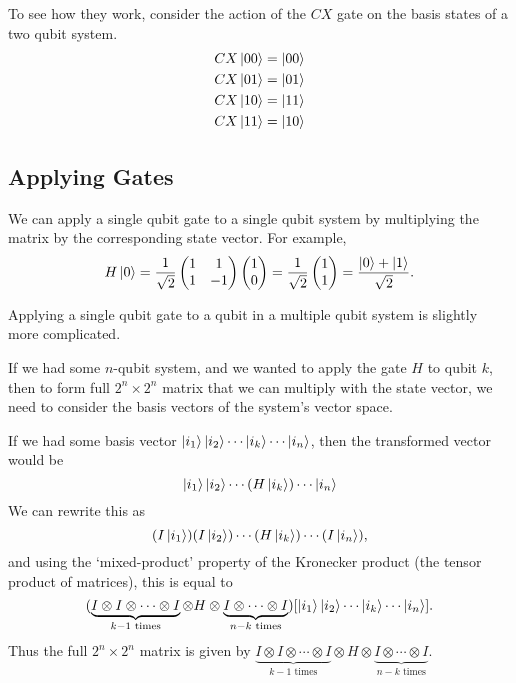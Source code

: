 \documentclass[11pt]{article}
\begin{document}
To see how they work, consider the action of the $CX$ gate on the basis states of a two qubit system.
\begin{align*}
	CX \ket{00} &= \ket{00} \\
	CX \ket{01} &= \ket{01} \\
	CX \ket{10} &= \ket{11} \\
	CX \ket{11} &= \ket{10} 
\end{align*}

\subsection{Applying Gates}

We can apply a single qubit gate to a single qubit system by multiplying the matrix by the corresponding state vector. For example,
$$
H \ket{0} = \frac{1}{\sqrt{2}}\begin{pmatrix}
	1 & 1 \\ 1 & -1
\end{pmatrix} \begin{pmatrix}
	1 \\ 0 
\end{pmatrix} = \frac{1}{\sqrt{2}}\begin{pmatrix}
	1 \\
	1
\end{pmatrix} = \frac{\ket{0} + \ket{1}}{\sqrt{2}}.
$$

Applying a single qubit gate to a qubit in a multiple qubit system is slightly more complicated. 

If we had some $n$-qubit system, and we wanted to apply the gate $H$ to qubit $k$, then to form full $2^n \times 2^n$ matrix that we can multiply with the state vector, we need to consider the basis vectors of the system's vector space.

If we had some basis vector $\ket{i_1}  \ket{i_2}   \cdots   \ket{i_k}   \cdots   \ket{i_n}$, then the transformed vector would be 
$$
\ket{i_1}  \ket{i_2}   \cdots   (H\ket{i_k})   \cdots   \ket{i_n}
$$
We can rewrite this as
$$
(I\ket{i_1})  (I\ket{i_2})   \cdots   (H\ket{i_k})   \cdots   (I\ket{i_n}),
$$
and using the `mixed-product' property of the Kronecker product (the tensor product of matrices), this is equal to
$$
(\underbrace{I \otimes  I \otimes  \cdots  \otimes I}_{k - 1 \text{ times}} \otimes  H  \otimes \underbrace{I \otimes  \cdots  \otimes I}_{n - k \text{ times}}) [\ket{i_1}  \ket{i_2}   \cdots   \ket{i_k}   \cdots   \ket{i_n}].
$$
Thus the full $2^n \times 2^n$ matrix is given by $\underbrace{I \otimes  I \otimes  \cdots  \otimes I}_{k - 1 \text{ times}} \otimes  H  \otimes \underbrace{I \otimes  \cdots  \otimes I}_{n - k \text{ times}}$.
\end{document}

